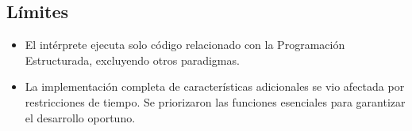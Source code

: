 \subsection{Límites}
\begin{itemize}
  \item El intérprete ejecuta solo código relacionado con la Programación Estructurada, excluyendo otros paradigmas.
  \item La implementación completa de características adicionales se vio afectada por restricciones de tiempo. Se priorizaron las funciones esenciales para garantizar el desarrollo oportuno.
\end{itemize}
